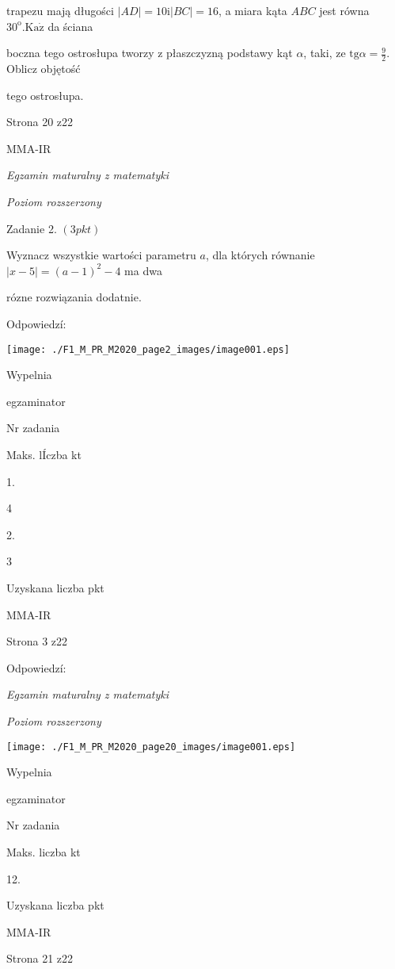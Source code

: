 \documentclass[a4paper,12pt]{article}
\begin{document}
trapezu mają długości $|AD|=10 \mathrm{i}|BC|=16$, a miara kąta $ABC$ jest równa $30^{\mathrm{o}}. \mathrm{K}\mathrm{a}\dot{\mathrm{z}}$ da ściana

boczna tego ostrosłupa tworzy z płaszczyzną podstawy kąt $\alpha$, taki, ze $\displaystyle \mathrm{t}\mathrm{g}\alpha=\frac{9}{2}$. Oblicz objętość

tego ostrosłupa.

Strona 20 z22

MMA-IR





{\it Egzamin maturalny z matematyki}

{\it Poziom rozszerzony}

Zadanie 2. $(3pkt)$

Wyznacz wszystkie wartości parametru $a$, dla których równanie $|x-5|=(a-1)^{2}-4$ ma dwa

rózne rozwiązania dodatnie.

Odpowiedzí:
\begin{center}
\texttt{[image: ./F1\_M\_PR\_M2020\_page2\_images/image001.eps]}
\end{center}
Wypelnia

egzaminator

Nr zadania

Maks. lÍczba kt

1.

4

2.

3

Uzyskana liczba pkt

MMA-IR

Strona 3 z22





Odpowiedzí:

{\it Egzamin maturalny z matematyki}

{\it Poziom rozszerzony}
\begin{center}
\texttt{[image: ./F1\_M\_PR\_M2020\_page20\_images/image001.eps]}
\end{center}
Wypelnia

egzaminator

Nr zadania

Maks. liczba kt

12.

Uzyskana liczba pkt

MMA-IR

Strona 21 z22
\end{document}
